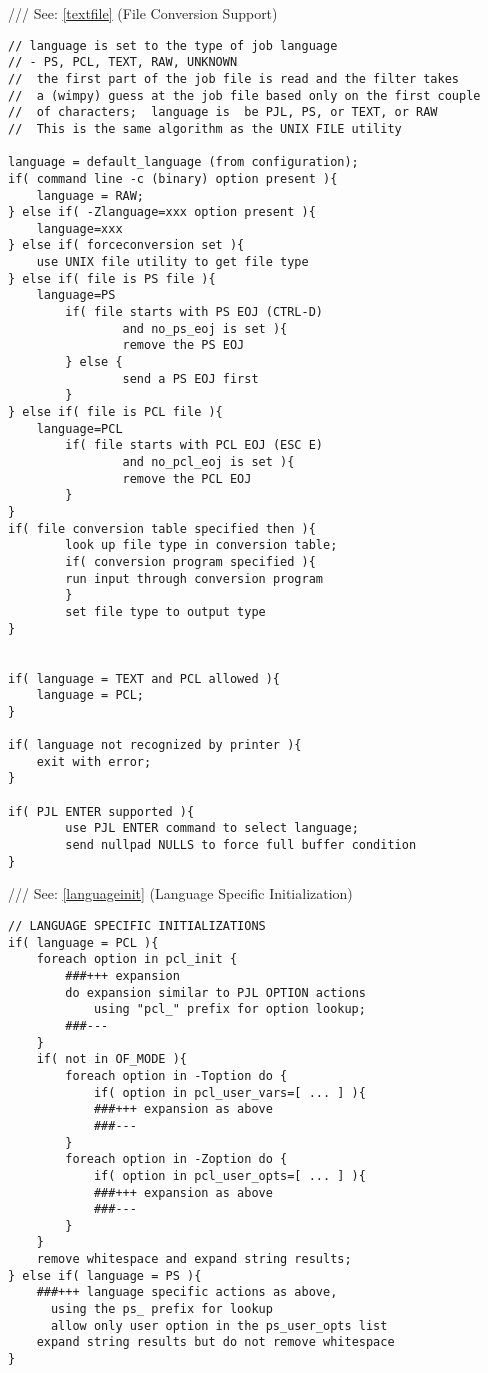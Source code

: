 \documentclass[a4paper]{article}
\begin{document}
{\ttfamily ///} See: \ref{textfile} {(File Conversion Support)}
\begin{tscreen}
\begin{verbatim}
// language is set to the type of job language
// - PS, PCL, TEXT, RAW, UNKNOWN
//  the first part of the job file is read and the filter takes
//  a (wimpy) guess at the job file based only on the first couple
//  of characters;  language is  be PJL, PS, or TEXT, or RAW
//  This is the same algorithm as the UNIX FILE utility

language = default_language (from configuration);
if( command line -c (binary) option present ){
    language = RAW;
} else if( -Zlanguage=xxx option present ){
    language=xxx
} else if( forceconversion set ){
    use UNIX file utility to get file type
} else if( file is PS file ){
    language=PS
        if( file starts with PS EOJ (CTRL-D)
                and no_ps_eoj is set ){
                remove the PS EOJ
        } else {
                send a PS EOJ first
        }
} else if( file is PCL file ){
    language=PCL
        if( file starts with PCL EOJ (ESC E)
                and no_pcl_eoj is set ){
                remove the PCL EOJ
        }
}
if( file conversion table specified then ){
        look up file type in conversion table;
        if( conversion program specified ){
        run input through conversion program
        }
        set file type to output type
}


if( language = TEXT and PCL allowed ){
    language = PCL;
}

if( language not recognized by printer ){
    exit with error;
}

if( PJL ENTER supported ){
        use PJL ENTER command to select language;
        send nullpad NULLS to force full buffer condition
}
\end{verbatim}
\end{tscreen}

{\ttfamily ///} See: \ref{languageinit} {(Language Specific Initialization)}
\label{pcl_user_opts}
\label{ps_user_opts}
\begin{tscreen}
\begin{verbatim}
// LANGUAGE SPECIFIC INITIALIZATIONS
if( language = PCL ){
    foreach option in pcl_init {
        ###+++ expansion 
        do expansion similar to PJL OPTION actions
            using "pcl_" prefix for option lookup;
        ###---
    }
    if( not in OF_MODE ){
        foreach option in -Toption do {
            if( option in pcl_user_vars=[ ... ] ){
            ###+++ expansion as above
            ###---
        }
        foreach option in -Zoption do {
            if( option in pcl_user_opts=[ ... ] ){
            ###+++ expansion as above
            ###---
        }
    }
    remove whitespace and expand string results;
} else if( language = PS ){
    ###+++ language specific actions as above,
      using the ps_ prefix for lookup 
      allow only user option in the ps_user_opts list
    expand string results but do not remove whitespace
}
\end{verbatim}
\end{tscreen}
\end{document}
